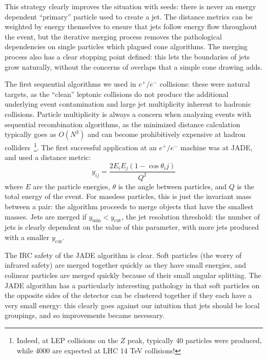 This strategy clearly improves the situation with seeds: there is never an energy dependent ``primary'' particle used to create a jet. The distance metrics can be weighted by energy themselves to ensure that jets follow energy flow throughout the event, but the iterative merging process removes the pathological dependencies on single particles which plagued cone algorithms. The merging process also has a clear stopping point defined: this lets the boundaries of jets grow naturally, without the concerns of overlaps that a simple cone drawing adds.


The first sequential algorithms we used in $e^+/e^-$ collisions: these were natural targets, as the ``clean'' leptonic collisions do not produce the additional underlying event contamination and large jet multiplicity inherent to hadronic collisions. Particle multiplicity is always a concern when analyzing events with sequential recombination algorithms, as the minimized distance calculation typically goes as $O(N^3)$ and can become prohibitively expensive at hadron colliders~\cite{Jetography}\footnote{Indeed, at LEP collisions on the $Z$ peak, typically 40 particles were produced, while 4000 are expected at LHC 14 TeV collisions!}. The first successful application at an $e^+/e^-$ machine was at JADE, and used a distance metric:
%
\begin{equation}
y_{ij} = \frac{2 E_i E_j (1 - \cos \theta_ij)}{Q^2}
\end{equation}
%
where $E$ are the particle energies, $\theta$ is the angle between particles, and $Q$ is the total energy of the event\cite{Jetography}. For massless particles, this is just the invariant mass between a pair: the algorithm proceeds to merge objects that have the smallest masses. Jets are merged if $y_\mathrm{min} < y_\mathrm{cut}$, the jet resolution threshold: the number of jets is clearly dependent on the value of this parameter, with more jets produced with a smaller $y_\mathrm{cut}$.

The IRC safety of the JADE algorithm is clear. Soft particles (the worry of infrared safety) are merged together quickly as they have small energies, and colinear particles are merged quickly because of their small angular splitting. The JADE algorithm has a particularly interesting pathology in that soft particles on the opposite sides of the detector can be clustered together if they each have a very small energy: this clearly goes against our intuition that jets should be local groupings, and so improvements became necessary.

